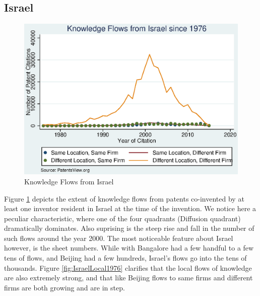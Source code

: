 \documentclass[12pt]{article}
\begin{document}
\subsection{Israel}

\begin{figure}[h]
\begin{centering}
  \includegraphics[width=\textwidth]{Israel1976}
  \caption{Knowledge Flows from Israel}
  \label{fig:Israel1976}
\end{centering}
\end{figure}
Figure \ref{fig:Israel1976} depicts the extent of knowledge flows from patents co-invented by at least one inventor resident in Israel at the time of the invention. We notice here a peculiar characteristic, where one of the four quadrants (Diffusion quadrant) dramatically dominates. Also suprising is the steep rise and fall in the number of such flows around the year 2000. The most noticeable feature about Israel however, is the sheet numbers. While with Bangalore had a few handful to a few tens of flows, and Beijing had a few hundreds, Israel's flows go into the tens of thousands. Figure \ref{fig:IsraelLocal1976} clarifies that the local flows of knowledge are also extremely strong, and that like Beijing flows to same firms and different firms are both growing and are in step. 
\end{document}
